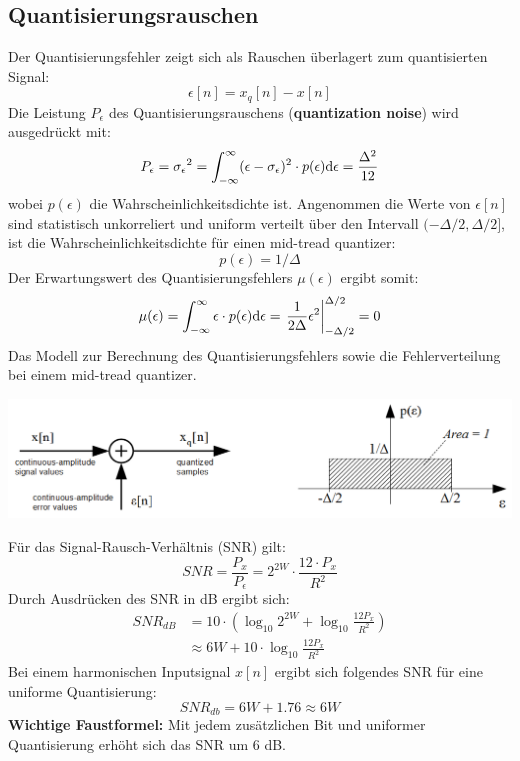 \subsection{Quantisierungsrauschen}
Der Quantisierungsfehler zeigt sich als Rauschen überlagert zum quantisierten
Signal:
\[ \epsilon[n] = x_q[n] - x[n] \]
Die Leistung $P_\epsilon$ des Quantisierungsrauschens
(\textbf{quantization noise}) wird ausgedrückt mit:
\[ P_\epsilon = {\sigma_\epsilon}^2 = \int_{-\infty}^{\infty} (\epsilon - 
	{\sigma_\epsilon})^2 \cdot p(\epsilon) \mathrm{d}\epsilon = 
	\frac{\Delta^2}{12}\]
wobei $p(\epsilon)$ die Wahrscheinlichkeitsdichte ist. Angenommen die Werte
von $\epsilon[n]$ sind statistisch unkorreliert und uniform verteilt über den
Intervall $(-\Delta/2, \Delta/2]$, ist die Wahrscheinlichkeitsdichte für einen
mid-tread quantizer:
\[ p(\epsilon) = 1/\Delta \] 
Der Erwartungswert des Quantisierungsfehlers $\mu(\epsilon)$ ergibt somit:
\[ \mu(\epsilon) = \int_{-\infty}^{\infty} \epsilon \cdot p(\epsilon) 
	\mathrm{d}\epsilon = \left. \frac{1}{2\Delta}\epsilon^2
	\right|_{-\Delta/2}^{\Delta/2} = 0 \]
Das Modell zur Berechnung des Quantisierungsfehlers sowie die Fehlerverteilung 
bei einem mid-tread quantizer. 
\begin{center}
	\includegraphics[width=.8\textwidth]{../fig/quantization_noise}
\end{center}
Für das Signal-Rausch-Verhältnis (SNR) gilt:
\[ SNR = \frac{P_x}{P_\epsilon} = 2^{2W} \cdot \frac{12 \cdot P_x}{R^2} \]
Durch Ausdrücken des SNR in dB ergibt sich:
\[\begin{aligned} SNR_{dB} &= 10 \cdot \left( \log_{10}2^{2W} +
	 \log_{10}\frac{12P_x}{R^2} \right)\\
	 &\approx 6W + 10 \cdot \log_{10}\frac{12P_x}{R^2} 
\end{aligned}\]
Bei einem harmonischen Inputsignal $x[n]$ ergibt sich folgendes SNR für
eine uniforme Quantisierung:
\[ SNR_{db} = 6W +1.76 \approx 6W \]
\textbf{Wichtige Faustformel:} Mit jedem zusätzlichen Bit und uniformer Quantisierung erhöht sich das SNR um 6 dB.
\newpage
